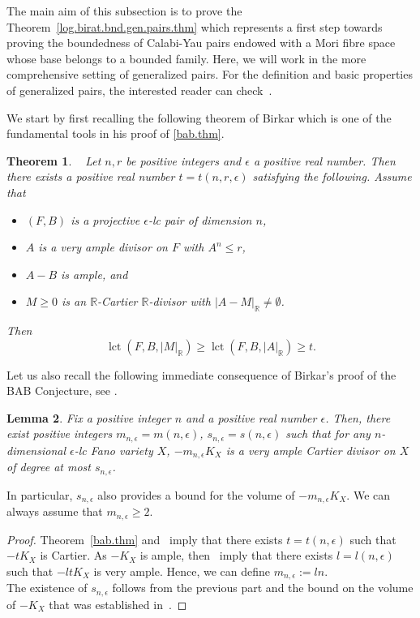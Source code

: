 \documentclass{amsart}[12pt,a4paper]
\newtheorem{theorem}{Theorem}[section]
\newtheorem{lemma}[theorem]{Lemma}
\theoremstyle{definition}
\DeclareMathOperator{\lct}{\mathrm{lct}}
\newcommand{\rr}{\mathbb{R}}
\begin{document}
The main aim of this subsection is to prove the Theorem~\ref{log.birat.bnd.gen.pairs.thm} which represents a first step towards proving the boundedness of Calabi-Yau pairs endowed with a Mori fibre space whose base belongs to a bounded family.
Here, we will work in the more comprehensive setting of generalized pairs.
For the definition and basic properties of generalized pairs, the interested reader can check~\cite[\S 4]{bir.zhang}.

We start by first recalling the following theorem of Birkar which 
is one of the fundamental tools in his proof of \ref{bab.thm}.

\begin{theorem}
\label{bnd.lct.thm}~\cite[Theorem~1.6]{bir16bab}
Let $n,r$ be positive integers and $\epsilon$ a positive real number. 
Then  there exists a positive real number $t= t(n,r,\epsilon)$ satisfying the following. 
	Assume that
	\begin{itemize}
	 \item $(F,B)$ is a projective $\epsilon$-lc pair of dimension $n$, 
	 \item $A$ is a very ample divisor on $F$ with $A^n\le r$,

	 \item $A-B$ is ample, and 

	 \item $M\ge 0$ is an $\rr$-Cartier $\rr$-divisor with $|A-M|_\rr\neq \emptyset$.
	\end{itemize}
	Then  	
	\[
	\lct(F,B,|M|_\rr)\ge \lct(F,B,|A|_\rr)\ge t.
	\]
\end{theorem}

Let us also recall the following immediate consequence of Birkar's proof of the BAB Conjecture, see \cite{bab16a, bir16bab}.

\begin{lemma}
\label{v.ample.index.lemma}
Fix a positive integer $n$ and a positive real number $\epsilon$.
Then, there exist positive integers $m_{n, \epsilon}=m(n, \epsilon)$, $s_{n, \epsilon}=s(n, \epsilon)$ such that for any $n$-dimensional $\epsilon$-lc Fano variety $X$, $-m_{n, \epsilon} K_X$ is a very ample Cartier divisor on $X$ of degree at most $s_{n, \epsilon}$.
\end{lemma}

In particular, $s_{n, \epsilon}$ also provides a bound for the volume of $-m_{n, \epsilon} K_X$. 
We can always assume that $m_{n, \epsilon} \geq 2$.

\begin{proof}
Theorem~\ref{bab.thm} and~\cite[Lemma 2.24]{bab16a} imply that there exists $t=t(n, \epsilon)$ such that $-tK_X$ is Cartier.
As $-K_X$ is ample, then~\cite[Theorem 1.1, Lemma 1.2]{K93} imply that there exists $l=l(n, \epsilon)$ such that $-ltK_X$ is very ample.
Hence, we can define $m_{n, \epsilon}:=ln$.
\\
The existence of $s_{n, \epsilon}$ follows from the previous part and the bound on the volume of $-K_X$ that was established in~\cite[Theorem~2.11]{bir16bab}.
\end{proof}
\end{document}
